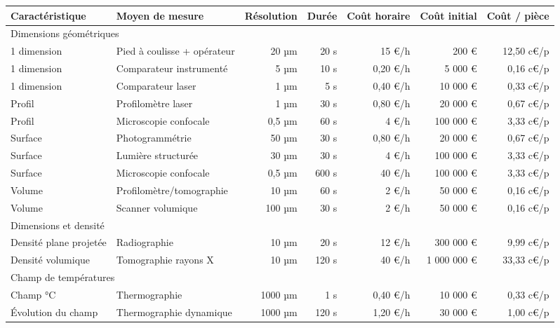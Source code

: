 \begin{table}[htpb]
	\hspace*{-1,5cm}
	\begin{tabular}{|l|l|r|r|r|r|r|}
		\arrayrulecolor{black}
		\hline
		Caractéristique & Moyen de mesure & Résolution & Durée & Coût horaire & Coût initial & Coût / pièce \\ \hline
		\hline
		\multicolumn{7}{|l|}{Dimensions géométriques} \\ \hline
		1 dimension & Pied à coulisse + opérateur & 20 µm & 20 s & 15 €/h & 200 € & 12,50 c€/p \\ \hline
		1 dimension & Comparateur instrumenté & 5 µm & 10 s & 0,20 €/h & 5 000 € & 0,16 c€/p \\ \hline
		1 dimension & Comparateur laser & 1 µm & 5 s & 0,40 €/h & 10 000 € & 0,33 c€/p \\ \hline
		\hline
		Profil & Profilomètre laser & 1 µm & 30 s & 0,80 €/h & 20 000 € & 0,67 c€/p \\ \hline
		Profil & Microscopie confocale & 0,5 µm & 60 s & 4 €/h & 100 000 € & 3,33 c€/p \\ \hline
		\hline
		Surface & Photogrammétrie & 50 µm & 30 s & 0,80 €/h & 20 000 € & 0,67 c€/p \\ \hline
		Surface & Lumière structurée & 30 µm & 30 s & 4 €/h & 100 000 € & 3,33 c€/p \\ \hline  %
		Surface & Microscopie confocale & 0,5 µm & 600 s & 40 €/h & 100 000 € & 3,33 c€/p \\ \hline
		\hline
		Volume & Profilomètre/tomographie & 10 µm & 60 s & 2 €/h & 50 000 € & 0,16 c€/p \\ \hline
		Volume & Scanner volumique & 100 µm & 30 s & 2 €/h & 50 000 € & 0,16 c€/p \\ \hline
		\hline
		\multicolumn{7}{|l|}{Dimensions et densité} \\ \hline
		Densité plane projetée & Radiographie & 10 µm & 20 s & 12 €/h & 300 000 € & 9,99 c€/p \\ \hline
		Densité volumique & Tomographie rayons X & 10 µm & 120 s & 40 €/h & 1 000 000 € & 33,33 c€/p \\ \hline
		\hline
		\multicolumn{7}{|l|}{Champ de températures} \\ \hline
		Champ °C & Thermographie & 1000 µm & 1 s & 0,40 €/h & 10 000 € & 0,33 c€/p \\ \hline
		Évolution du champ & Thermographie dynamique & 1000 µm & 120 s & 1,20 €/h & 30 000 € & 1,00 c€/p \\ \hline

\end{tabular}
\end{table}
